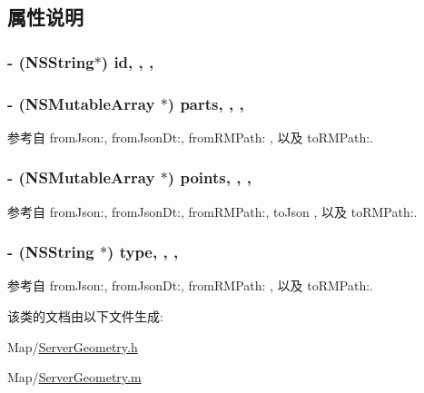 \subsection{属性说明}
\hypertarget{interface_server_geometry_aeaf1259147fdbd921ffd3fbb2cad2042}{
\subsubsection[{id}]{\setlength{\rightskip}{0pt plus 5cm}-\/ (N\-S\-String$\ast$) id\hspace{0.3cm}{\ttfamily [read]}, {\ttfamily [write]}, {\ttfamily [atomic]}, {\ttfamily [copy]}}}\label{interface_server_geometry_aeaf1259147fdbd921ffd3fbb2cad2042}
\hypertarget{interface_server_geometry_a3f8f113f0b46713c25d6b1aa15a52d86}{
\subsubsection[{parts}]{\setlength{\rightskip}{0pt plus 5cm}-\/ (N\-S\-Mutable\-Array $\ast$) parts\hspace{0.3cm}{\ttfamily [read]}, {\ttfamily [write]}, {\ttfamily [atomic]}, {\ttfamily [retain]}}}\label{interface_server_geometry_a3f8f113f0b46713c25d6b1aa15a52d86}


参考自 from\-Json\-:, from\-Json\-Dt\-:, from\-R\-M\-Path\-: , 以及 to\-R\-M\-Path\-:.

\hypertarget{interface_server_geometry_a8570da749c6442e61ef55b7966a5befb}{
\subsubsection[{points}]{\setlength{\rightskip}{0pt plus 5cm}-\/ (N\-S\-Mutable\-Array $\ast$) points\hspace{0.3cm}{\ttfamily [read]}, {\ttfamily [write]}, {\ttfamily [atomic]}, {\ttfamily [retain]}}}\label{interface_server_geometry_a8570da749c6442e61ef55b7966a5befb}


参考自 from\-Json\-:, from\-Json\-Dt\-:, from\-R\-M\-Path\-:, to\-Json , 以及 to\-R\-M\-Path\-:.

\hypertarget{interface_server_geometry_a362e7ec6a642117e172be2437a40ede5}{
\subsubsection[{type}]{\setlength{\rightskip}{0pt plus 5cm}-\/ (N\-S\-String $\ast$) type\hspace{0.3cm}{\ttfamily [read]}, {\ttfamily [write]}, {\ttfamily [atomic]}, {\ttfamily [copy]}}}\label{interface_server_geometry_a362e7ec6a642117e172be2437a40ede5}


参考自 from\-Json\-:, from\-Json\-Dt\-:, from\-R\-M\-Path\-: , 以及 to\-R\-M\-Path\-:.



该类的文档由以下文件生成\-:\begin{DoxyCompactItemize}
\item 
Map/\hyperlink{_server_geometry_8h}{Server\-Geometry.\-h}\item 
Map/\hyperlink{_server_geometry_8m}{Server\-Geometry.\-m}\end{DoxyCompactItemize}
